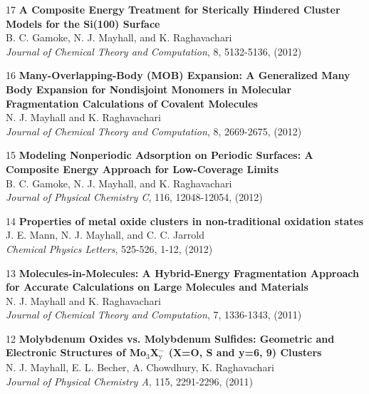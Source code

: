 \documentclass[10pt]{article}
\newenvironment{lonelist}[1][\enskip\textbullet]%
        {\vspace{-\baselineskip}\begin{list}{#1}{%
        \setlength{\partopsep}{0pt}%
        \setlength{\topsep}{0pt}}}
        {\end{list}\vspace{-.6\baselineskip}}
\begin{document}
\begin{lonelist}
\item[17\hspace{4pt}] \textbf{A Composite Energy Treatment for Sterically Hindered Cluster Models for the Si(100) Surface}\\
B. C. Gamoke, N. J. Mayhall, and K. Raghavachari \\
\textsl{Journal of Chemical Theory and Computation}, 8, 5132-5136, (2012)

\item [16\hspace{4pt}]
\textbf{Many-Overlapping-Body (MOB) Expansion: A Generalized Many Body Expansion for Nondisjoint Monomers in Molecular Fragmentation Calculations of Covalent Molecules} \\
N. J. Mayhall and K. Raghavachari \\
\textsl{Journal of Chemical Theory and Computation}, 8, 2669-2675, (2012)

\item[15\hspace{4pt}] \textbf{Modeling Nonperiodic Adsorption on Periodic Surfaces: A Composite Energy Approach for Low-Coverage Limits}\\
B. C. Gamoke, N. J. Mayhall, and K. Raghavachari \\
\textsl{Journal of Physical Chemistry C}, 116, 12048-12054, (2012)

\item[14\hspace{4pt}] \textbf{Properties of metal oxide clusters in non-traditional oxidation states}\\
J. E. Mann, N. J. Mayhall, and C. C. Jarrold\\
 \textsl{Chemical Physics Letters}, 525-526, 1-12, (2012)

\item[13\hspace{4pt}] \textbf{Molecules-in-Molecules: A Hybrid-Energy Fragmentation Approach for Accurate Calculations on Large Molecules and Materials}\\
N. J. Mayhall and K. Raghavachari\\
\textsl{Journal of Chemical Theory and Computation}, 7, 1336-1343, (2011)

\item[12\hspace{4pt}] \textbf{Molybdenum Oxides vs. Molybdenum Sulfides: Geometric and Electronic Structures of Mo$_{3}$X$_{\text{y}}^{-}$ (X=O, S and y=6, 9) Clusters}\\
N. J. Mayhall, E. L. Becher, A. Chowdhury, K. Raghavachari\\
\textsl{Journal of Physical Chemistry A}, 115, 2291-2296, (2011)


\end{lonelist}
\end{document}
